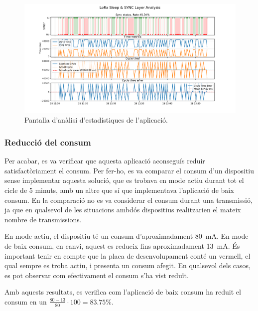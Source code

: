 \documentclass{tfgitic}[2024/07/01]
\begin{document}
{\begin{figure}
    \centering
    \includegraphics[width=1\textwidth]{imatges/pantallaAnalisis.pdf}
    \caption{Pantalla d'anàlisi d'estadístiques de l'aplicació.}
    \label{fig:app_grafics_sinc}                                                                                  
\end{figure} 

\subsubsection{Reducció del consum}
Per acabar, es va verificar que aquesta aplicació aconseguís reduir satisfactòriament el consum. Per fer-ho, es va comparar el consum d'un dispositiu sense implementar aquesta solució, que es trobava en mode actiu durant tot el cicle de 5 minuts, amb un altre que sí que implementava l'aplicació de baix consum. En la comparació no es va considerar el consum durant una transmissió, ja que en qualsevol de les situacions ambdós dispositius realitzarien el mateix nombre de transmissions.

En mode actiu, el dispositiu té un consum d'aproximadament \SI{80}{\milli\ampere}. En mode de baix consum, en canvi, aquest es redueix fins aproximadament \SI{13}{\milli\ampere}. És important tenir en compte que la placa de desenvolupament conté un  vermell, el qual sempre es troba actiu, i presenta un consum afegit. En qualsevol dels casos, es pot observar com efectivament el consum s'ha vist reduït.

Amb aquests resultats, es verifica com l'aplicació de baix consum ha reduit el consum en un $\frac{80-13}{80}\cdot100=83.75\%$. 


}
\end{document}
